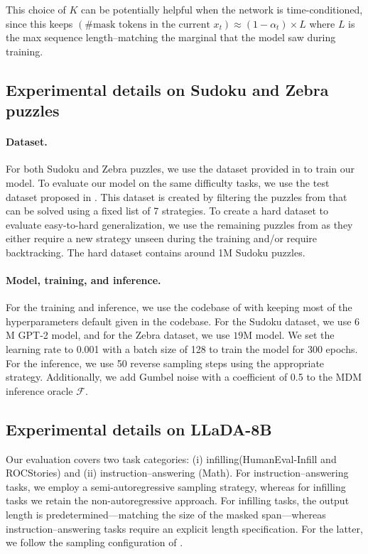 This choice of $K$ can be potentially helpful when the network is time-conditioned, since this keeps $(\# \text{mask tokens in the current $x_t$})\approx (1-\alpha_t)\times L$ where $L$ is the max sequence length--matching the marginal that the model saw during training.


\subsection{Experimental details on Sudoku and Zebra puzzles}
\label{appendix:sudoku-zebra-exp-details}

\paragraph{Dataset.} For both Sudoku and Zebra puzzles, we use the dataset provided in \citet{shah2024causal} to train our model. To evaluate our model on the same difficulty tasks, we use the test dataset proposed in \citet{shah2024causal}. This dataset is created by filtering the puzzles from \cite{david_g__radcliffe_2020} that can be solved using a fixed list of 7 strategies. To create a hard dataset to evaluate easy-to-hard generalization, we use the remaining puzzles from \cite{david_g__radcliffe_2020} as they either require a new strategy unseen during the training and/or require backtracking. The hard dataset contains around 1M Sudoku puzzles.

\paragraph{Model, training, and inference.} For the training and inference, we use the codebase of \cite{ye2024beyond} with keeping most of the hyperparameters default given in the codebase. For the Sudoku dataset, we use $6$M GPT-2 model, and for the Zebra dataset, we use $19$M model. We set the learning rate to 0.001 with a batch size of 128 to train the model for 300 epochs. For the inference, we use 50 reverse sampling steps using the appropriate strategy.  Additionally, we add Gumbel noise with a coefficient of 0.5 to the MDM inference oracle $\mathcal{F}$. 

\subsection{Experimental details on LLaDA-8B} \label{sec:llada_detail}

Our evaluation covers two task categories: (i) infilling(HumanEval-Infill and ROCStories) and (ii) instruction–answering (Math). For instruction–answering tasks, we employ a semi-autoregressive sampling strategy, whereas for infilling tasks we retain the non-autoregressive approach. For infilling tasks, the output length is predetermined—matching the size of the masked span—whereas instruction–answering tasks require an explicit length specification. For the latter, we follow the sampling configuration of \cite{nie2025large}.


